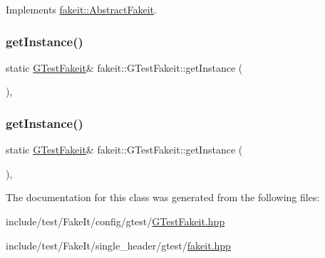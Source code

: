 Implements \mbox{\hyperlink{classfakeit_1_1AbstractFakeit_a9476180a503524d49d1978fbbc125b01}{fakeit\+::\+Abstract\+Fakeit}}.

\mbox{\label{classfakeit_1_1GTestFakeit_a8e543c089507b2e31839cf5d6140d01b}} 
\subsubsection{\texorpdfstring{getInstance()}{getInstance()}\hspace{0.1cm}{\footnotesize\ttfamily [1/2]}}
{\footnotesize\ttfamily static \mbox{\hyperlink{classfakeit_1_1GTestFakeit}{G\+Test\+Fakeit}}\& fakeit\+::\+G\+Test\+Fakeit\+::get\+Instance (\begin{DoxyParamCaption}{ }\end{DoxyParamCaption})\hspace{0.3cm}{\ttfamily [inline]}, {\ttfamily [static]}}

\mbox{\label{classfakeit_1_1GTestFakeit_a8e543c089507b2e31839cf5d6140d01b}} 
\subsubsection{\texorpdfstring{getInstance()}{getInstance()}\hspace{0.1cm}{\footnotesize\ttfamily [2/2]}}
{\footnotesize\ttfamily static \mbox{\hyperlink{classfakeit_1_1GTestFakeit}{G\+Test\+Fakeit}}\& fakeit\+::\+G\+Test\+Fakeit\+::get\+Instance (\begin{DoxyParamCaption}{ }\end{DoxyParamCaption})\hspace{0.3cm}{\ttfamily [inline]}, {\ttfamily [static]}}



The documentation for this class was generated from the following files\+:\begin{DoxyCompactItemize}
\item 
include/test/\+Fake\+It/config/gtest/\mbox{\hyperlink{GTestFakeit_8hpp}{G\+Test\+Fakeit.\+hpp}}\item 
include/test/\+Fake\+It/single\+\_\+header/gtest/\mbox{\hyperlink{single__header_2gtest_2fakeit_8hpp}{fakeit.\+hpp}}\end{DoxyCompactItemize}

